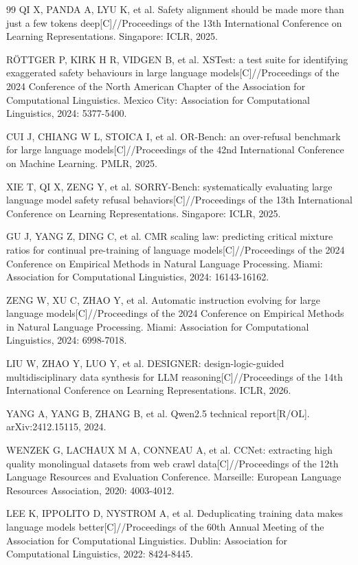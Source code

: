 \documentclass[fontset=fandol,type=master,campus=shenzhen,etitleauto=true]{hithesisbook}
\begin{document}
\begin{thebibliography}{99}
 QI X, PANDA A, LYU K, et al. Safety alignment should be made more than just a few tokens deep[C]//Proceedings of the 13th International Conference on Learning Representations. Singapore: ICLR, 2025.

 RÖTTGER P, KIRK H R, VIDGEN B, et al. XSTest: a test suite for identifying exaggerated safety behaviours in large language models[C]//Proceedings of the 2024 Conference of the North American Chapter of the Association for Computational Linguistics. Mexico City: Association for Computational Linguistics, 2024: 5377-5400.

 CUI J, CHIANG W L, STOICA I, et al. OR-Bench: an over-refusal benchmark for large language models[C]//Proceedings of the 42nd International Conference on Machine Learning. PMLR, 2025.

 XIE T, QI X, ZENG Y, et al. SORRY-Bench: systematically evaluating large language model safety refusal behaviors[C]//Proceedings of the 13th International Conference on Learning Representations. Singapore: ICLR, 2025.

 GU J, YANG Z, DING C, et al. CMR scaling law: predicting critical mixture ratios for continual pre-training of language models[C]//Proceedings of the 2024 Conference on Empirical Methods in Natural Language Processing. Miami: Association for Computational Linguistics, 2024: 16143-16162.

 ZENG W, XU C, ZHAO Y, et al. Automatic instruction evolving for large language models[C]//Proceedings of the 2024 Conference on Empirical Methods in Natural Language Processing. Miami: Association for Computational Linguistics, 2024: 6998-7018.

 LIU W, ZHAO Y, LUO Y, et al. DESIGNER: design-logic-guided multidisciplinary data synthesis for LLM reasoning[C]//Proceedings of the 14th International Conference on Learning Representations. ICLR, 2026.

 YANG A, YANG B, ZHANG B, et al. Qwen2.5 technical report[R/OL]. arXiv:2412.15115, 2024.

 WENZEK G, LACHAUX M A, CONNEAU A, et al. CCNet: extracting high quality monolingual datasets from web crawl data[C]//Proceedings of the 12th Language Resources and Evaluation Conference. Marseille: European Language Resources Association, 2020: 4003-4012.

 LEE K, IPPOLITO D, NYSTROM A, et al. Deduplicating training data makes language models better[C]//Proceedings of the 60th Annual Meeting of the Association for Computational Linguistics. Dublin: Association for Computational Linguistics, 2022: 8424-8445.


\end{thebibliography}
\end{document}
